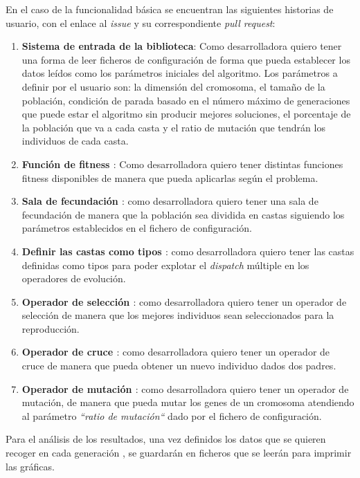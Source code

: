 En el caso de la funcionalidad básica se encuentran las siguientes historias de usuario, con el enlace al
\emph{issue} y su correspondiente \emph{pull request}:

\begin{enumerate}
    \item \textbf{Sistema de entrada de la biblioteca}: Como desarrolladora quiero tener una forma de leer ficheros de configuración de forma que pueda
    establecer los datos leídos como los parámetros iniciales del algoritmo. Los parámetros a definir por el usuario son: la dimensión del cromosoma, el tamaño de la población, 
    condición de parada basado en el número máximo de generaciones que puede estar el algoritmo sin producir mejores soluciones, el porcentaje de la población que va a cada casta y 
    el ratio de mutación que tendrán los individuos de cada casta.
    \item \textbf{Función de fitness \cite{project_repository_8}}: Como desarrolladora quiero tener distintas funciones fitness disponibles de manera que pueda aplicarlas según 
    el problema.
    \item \textbf{Sala de fecundación \cite{project_repository_17}}: como desarrolladora quiero tener una sala de fecundación de manera que la población sea dividida en castas siguiendo los parámetros establecidos
    en el fichero de configuración.
    \item \textbf{Definir las castas como tipos \cite{project_repository_21}}: como desarrolladora quiero tener las castas definidas como tipos para poder explotar el \emph{dispatch} múltiple en los operadores de evolución.
    \item \textbf{Operador de selección \cite{project_repository_18}}: como desarrolladora quiero tener un operador de selección de manera que los mejores individuos sean seleccionados para la reproducción.
    \item \textbf{Operador de cruce \cite{project_repository_19}}: como desarrolladora quiero tener un operador de cruce de manera que pueda obtener un nuevo individuo dados dos padres.
    \item \textbf{Operador de mutación \cite{project_repository_20}}: como desarrolladora quiero tener un operador de mutación, de manera que pueda mutar los genes de un cromosoma atendiendo al parámetro
    \emph{``ratio de mutación``} dado por el fichero de configuración. 
\end{enumerate}

Para el análisis de los resultados, una vez definidos los datos que se quieren recoger en cada generación \cite{pull_17}, 
se guardarán en ficheros que se leerán para imprimir las gráficas.



